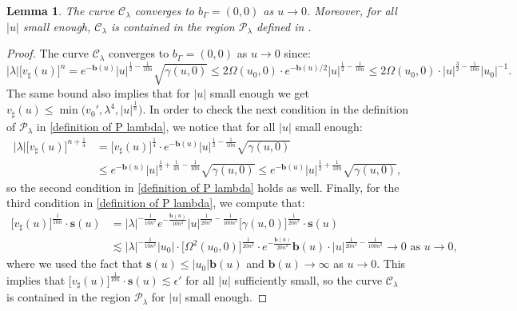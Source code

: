 \documentclass[11pt]{article}
\newtheorem{lemma}{Lemma}[section]
\numberwithin{equation}{section}
\begin{document}
\begin{lemma}\label{curve C lemma}
    The curve $\mathcal{C}_{\lambda}$ converges to $b_{\Gamma}=(0,0)$ as $u\rightarrow0$. Moreover, for all $|u|$ small enough, $\mathcal{C}_{\lambda}$ is contained in the region $\mathcal{P}_{\lambda}$ defined in .
\end{lemma}
\begin{proof}
    The curve $\mathcal{C}_{\lambda}$ converges to $b_{\Gamma}=(0,0)$ as $u\rightarrow0$ since:
    \[|\lambda|\big[v_{\sharp}(u)\big]^{n}=e^{-\mathbf{b}(u)}|u|^{\frac{1}{2}-\frac{1}{10n}}\sqrt{\gamma(u,0)}\leq2\Omega(u_0,0)\cdot e^{-\mathbf{b}(u)/2}|u|^{\frac{1}{2}-\frac{1}{10n}}\leq2\Omega(u_0,0)\cdot|u|^{\frac{3}{2}-\frac{1}{10n}}|u_0|^{-1}.\]
    The same bound also implies that for $|u|$ small enough we get $v_{\sharp}(u)\leq\min\big(v_0',\lambda^4,|u|^{\frac{1}{n}}\big).$ In order to check the next condition in the definition of $\mathcal{P}_{\lambda}$ in \eqref{definition of P lambda}, we notice that for all $|u|$ small enough:
    \begin{align*}
        |\lambda|\big[v_{\sharp}(u)\big]^{n+\frac{1}{4}}&=\big[v_{\sharp}(u)\big]^{\frac{1}{4}}\cdot e^{-\mathbf{b}(u)}|u|^{\frac{1}{2}-\frac{1}{10n}}\sqrt{\gamma(u,0)}\\
        &\leq e^{-\mathbf{b}(u)}|u|^{\frac{1}{2}+\frac{1}{4n}-\frac{1}{10n}}\sqrt{\gamma(u,0)}\leq e^{-\mathbf{b}(u)}|u|^{\frac{1}{2}+\frac{1}{10n}}\sqrt{\gamma(u,0)},
    \end{align*}
    so the second condition in \eqref{definition of P lambda} holds as well. Finally, for the third condition in \eqref{definition of P lambda}, we compute that:
    \begin{align*}
        \big[v_{\sharp}(u)\big]^{\frac{1}{10n}}\cdot\mathbf{s}(u)&=|\lambda|^{-\frac{1}{10n^2}}e^{-\frac{\mathbf{b}(u)}{10n^2}}|u|^{\frac{1}{20n^2}-\frac{1}{100n^3}}\big[\gamma(u,0)\big]^{\frac{1}{20n^2}}\cdot\mathbf{s}(u)\\
        &\lesssim|\lambda|^{-\frac{1}{10n^2}}|u_0|\cdot\big[\Omega^2(u_0,0)\big]^{\frac{1}{20n^2}}\cdot e^{-\frac{\mathbf{b}(u)}{20n^2}}\mathbf{b}(u)\cdot|u|^{\frac{1}{20n^2}-\frac{1}{100n^3}}\rightarrow0\text{ as }u\rightarrow0,
    \end{align*}
    where we used the fact that $\mathbf{s}(u)\leq|u_0|\mathbf{b}(u)$ and $\mathbf{b}(u)\rightarrow\infty$ as $u\rightarrow0.$ This implies that $\big[v_{\sharp}(u)\big]^{\frac{1}{10n}}\cdot\mathbf{s}(u)\lesssim\epsilon'$ for all $|u|$ sufficiently small, so the curve $\mathcal{C}_{\lambda}$ is contained in the region $\mathcal{P}_{\lambda}$ for $|u|$ small enough.
\end{proof}
\end{document}
